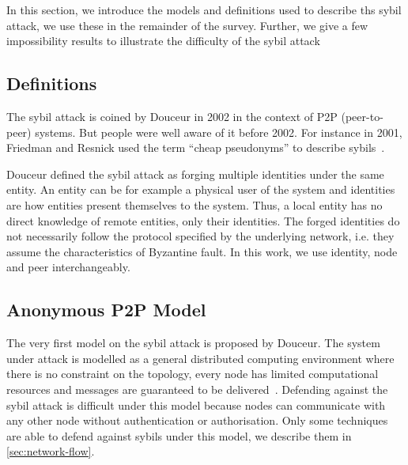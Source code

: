 In this section, we introduce the models and definitions used to describe ths
sybil attack, we use these in the remainder of the survey. Further, we give a
few impossibility results to illustrate the difficulty of the sybil attack

\subsection{Definitions}
The sybil attack is coined by Douceur\cite{douceur2002sybil} in 2002 in the
context of P2P (peer-to-peer) systems. But people were well aware of it before
2002. For instance in 2001, Friedman and Resnick used the term ``cheap
pseudonyms'' to describe sybils~\cite{resnick2001social}. 

Douceur defined the sybil attack as forging multiple identities under the same
entity\cite{douceur2002sybil}. An entity can be for example a physical user of
the system and identities are how entities present themselves to the system.
Thus, a local entity has no direct knowledge of remote entities, only their
identities. The forged identities do not necessarily follow the protocol
specified by the underlying network, i.e. they assume the characteristics of
Byzantine fault\cite{lamport1982byzantine}. In this work, we use identity, node
and peer interchangeably.

\subsection{Anonymous P2P Model}
The very first model on the sybil attack is proposed by Douceur. The system
under attack is modelled as a general distributed computing environment where
there is no constraint on the topology, every node has limited computational
resources and messages are guaranteed to be delivered~\cite{douceur2002sybil}.
Defending against the sybil attack is difficult under this model because nodes
can communicate with any other node without authentication or authorisation.
Only some techniques are able to defend against sybils under this model, we
describe them in \autoref{sec:network-flow}.

